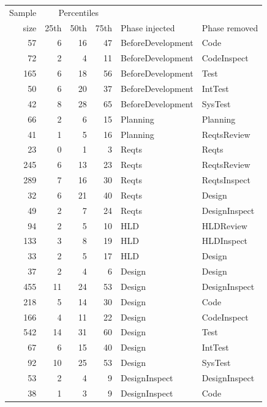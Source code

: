 \documentclass{sig-alternate}
\def\baselinestretch{1}
\begin{document}
\begin{figure}[!t]

\renewcommand{\baselinestretch}{0.7}
\scriptsize
\begin{center}
\begin{tabular}{r|rrr|ll}
  Sample&\multicolumn{3}{c|}{Percentiles}\\ 
size & 25th & 50th & 75th & Phase injected & Phase removed\\\hline
57& 6& 16& 47&  BeforeDevelopment&Code\\
72& 2& 4& 11&  BeforeDevelopment&CodeInspect\\
165& 6& 18& 56&  BeforeDevelopment&Test\\
50& 6& 20& 37&  BeforeDevelopment&IntTest\\
42& 8& 28& 65&  BeforeDevelopment&SysTest\\\hline

66& 2& 6& 15&  Planning&Planning\\
41& 1& 5& 16&  Planning&ReqtsReview\\\hline

23& 0& 1& 3&  Reqts&Reqts\\
245& 6& 13& 23&  Reqts&ReqtsReview\\
289& 7& 16& 30&  Reqts&ReqtsInspect\\
32& 6& 21& 40&  Reqts&Design\\
49& 2& 7& 24&  Reqts&DesignInspect\\\hline
 

94& 2& 5& 10&  HLD&HLDReview\\
133& 3& 8& 19&  HLD&HLDInspect\\
33& 2& 5& 17&  HLD&Design\\\hline



37& 2& 4& 6&  Design&Design\\
455& 11& 24& 53&  Design&DesignInspect\\
218& 5& 14& 30&  Design&Code\\
166& 4& 11& 22&  Design&CodeInspect\\
542& 14& 31& 60&  Design&Test\\
67& 6& 15& 40&  Design&IntTest\\
92& 10& 25& 53&  Design&SysTest\\\hline

53& 2& 4& 9&  DesignInspect&DesignInspect\\
38& 1& 3& 9&  DesignInspect&Code\\\hline


\end{tabular}
\end{center}
\end{figure}
\end{document}
